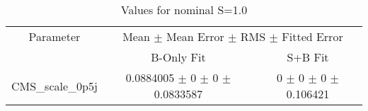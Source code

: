\begin{table}
\centering
\caption{Values for nominal S=1.0}
\begin{tabular}{ccc}
\toprule
Parameter & \multicolumn{2}{c}{Mean $\pm$ Mean Error $\pm$ RMS $\pm$ Fitted Error}\\
 & B-Only Fit & S+B Fit\\
\midrule
CMS\_scale\_0p5j & \num{0.0884005} $\pm$ \num{0} $\pm$ \num{0} $\pm$ \num{0.0833587} & \num{0} $\pm$ \num{0} $\pm$ \num{0} $\pm$ \num{0.106421}\\
\bottomrule
\end{tabular}
\end{table}